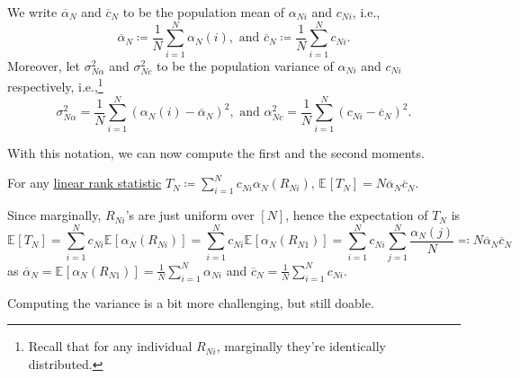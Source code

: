 \begin{notation}
	We write \(\overline{\alpha} _N\) and \(\overline{c} _N\) to be the population mean of \(\alpha _{Ni}\) and \(c_{Ni}\), i.e.,
	\[
		\overline{\alpha} _N \coloneqq \frac{1}{N} \sum_{i=1}^{N} \alpha _N(i), \text{ and }
		\overline{c} _N \coloneqq \frac{1}{N} \sum_{i=1}^{N} c_{Ni}.
	\]
	Moreover, let \(\sigma _{N \alpha }^2\) and \(\sigma _{Nc}^2\) to be the population variance of \(\alpha _{Ni}\) and \(c_{Ni}\) respectively, i.e.,\footnote{Recall that for any individual \(R_{Ni}\), marginally they're identically distributed.}
	\[
		\sigma _{N \alpha }^2 = \frac{1}{N} \sum_{i=1}^{N} (\alpha _N(i) - \overline{\alpha} _N)^2, \text{ and }
		\alpha _{N c}^2 = \frac{1}{N} \sum_{i=1}^{N} (c_{Ni} - \overline{c} _N)^2.
	\]
\end{notation}

With this notation, we can now compute the first and the second moments.

\begin{claim}
	For any \hyperref[def:linrea-rank-statistic]{linear rank statistic} \(T_N \coloneqq \sum_{i=1}^{N} c_{Ni} \alpha _N (R_{Ni})\), \(\mathbb{E}_{}[T_N] = N \overline{\alpha} _N \overline{c} _N\).
\end{claim}
\begin{explanation}
	Since marginally, \(R_{Ni}\)'s are just uniform over \([N]\), hence the expectation of \(T_N\) is
	\[
		\mathbb{E}_{}[T_N]
		= \sum_{i=1}^{N} c_{Ni} \mathbb{E}_{}[\alpha _N(R_{Ni})]
		= \sum_{i=1}^{N} c_{Ni} \mathbb{E}_{}[\alpha _N(R_{N1})]
		= \sum_{i=1}^{N} c_{Ni} \sum_{j=1}^{N} \frac{\alpha _N(j)}{N}
		\eqqcolon N \overline{\alpha} _N \overline{c} _N
	\]
	as \(\overline{\alpha} _N = \mathbb{E}_{}[\alpha _N(R_{N1})] = \frac{1}{N} \sum_{i=1}^{N} \alpha _{Ni}\) and \(\overline{c} _N = \frac{1}{N} \sum_{i=1}^{N} c_{Ni}\).
\end{explanation}

Computing the variance is a bit more challenging, but still doable.

